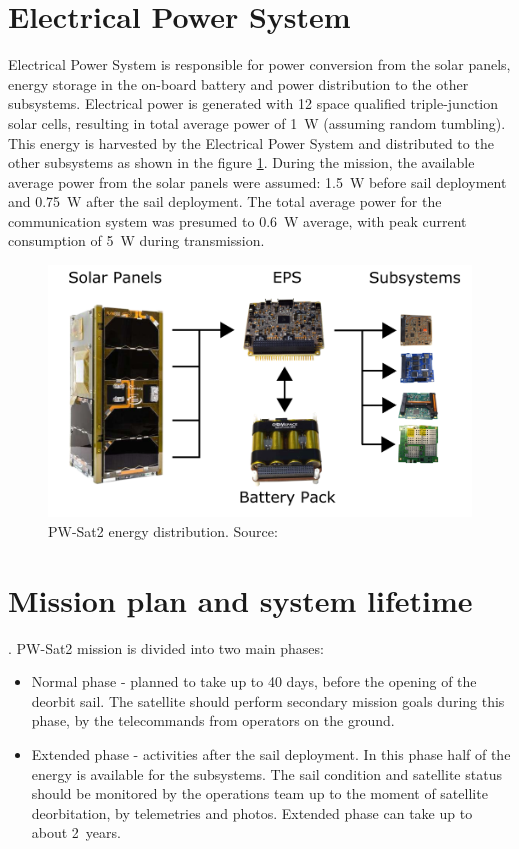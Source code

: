 \section{Electrical Power System}
Electrical Power System is responsible for power conversion from the solar panels, energy storage in the on-board battery and power distribution to the other subsystems. Electrical power is generated with \si{12} space qualified triple-junction solar cells, resulting in total average power of \SI{1}{\watt} (assuming random tumbling). This energy is harvested by the Electrical Power System and distributed to the other subsystems as shown in the figure \ref{pwsat_eps_distribution}. During the mission, the available average power from the solar panels were assumed: \SI{1.5}{\watt} before sail deployment and \SI{0.75}{\watt} after the sail deployment. The total average power for the communication system was presumed to \SI{0.6}{\watt} average, with peak current consumption of \SI{5}{\watt} during transmission.
\begin{figure}
    \centering
    \includegraphics[width=0.7\paperwidth]{img/3/pwsat_eps_distribution.png}
    \caption{PW-Sat2 energy distribution. Source: \cite{PW_sat2_photo}}
    \label{pwsat_eps_distribution}
\end{figure}

\section{Mission plan and system lifetime}
\label{sect:mission_phases}.
PW-Sat2 mission is divided into two main phases:
\begin{itemize}
    \item Normal phase - planned to take up to 40 days, before the opening of the deorbit sail. The satellite should perform secondary mission goals during this phase, by the telecommands from operators on the ground. 
    \item Extended phase - activities after the sail deployment. In this phase half of the energy is available for the subsystems. The sail condition and satellite status should be monitored by the operations team up to the moment of satellite deorbitation, by telemetries and photos. Extended phase can take up to about \si{2}~years.
\end{itemize}

